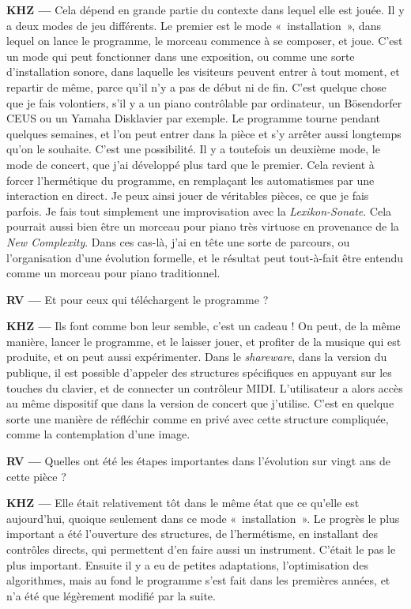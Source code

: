 \documentclass[a4paper,12pt]{article}
\newcommand{\guill}[1]{«~#1~»}
\begin{document}
\textbf{KHZ ---} Cela dépend en grande partie du contexte dans lequel elle est jouée. Il y a deux modes de jeu différents. Le premier est le mode \guill{installation}, dans lequel on lance le programme, le morceau commence à se composer, et joue. C'est un mode qui peut fonctionner dans une exposition, ou comme une sorte d'installation sonore, dans laquelle les visiteurs peuvent entrer à tout moment, et repartir de même, parce qu'il n'y a pas de début ni de fin. C'est quelque chose que je fais volontiers, s'il y a un piano contrôlable par ordinateur, un Bösendorfer CEUS ou un Yamaha Disklavier par exemple. Le programme tourne pendant quelques semaines, et l'on peut entrer dans la pièce et s'y arrêter aussi longtemps qu'on le souhaite. C'est une possibilité. Il y a toutefois un deuxième mode, le mode de concert, que j'ai développé plus tard que le premier. Cela revient à forcer l'hermétique du programme, en remplaçant les automatismes par une interaction en direct. Je peux ainsi jouer de véritables pièces, ce que je fais parfois. Je fais tout simplement une improvisation avec la \emph{Lexikon-Sonate}. Cela pourrait aussi bien être un morceau pour piano très virtuose en provenance de la \emph{New Complexity}. Dans ces cas-là, j'ai en tête une sorte de parcours, ou l'organisation d'une évolution formelle, et le résultat peut tout-à-fait être entendu comme un morceau pour piano traditionnel.

\textbf{RV ---} Et pour ceux qui téléchargent le programme ?

\textbf{KHZ ---} Ils font comme bon leur semble, c'est un cadeau ! On peut, de la même manière, lancer le programme, et le laisser jouer, et profiter de la musique qui est produite, et on peut aussi expérimenter. Dans le \emph{shareware}, dans la version du publique, il est possible d'appeler des structures spécifiques en appuyant sur les touches du clavier, et de connecter un contrôleur MIDI. L'utilisateur a alors accès au même dispositif que dans la version de concert que j'utilise. C'est en quelque sorte une manière de réfléchir comme en privé avec cette structure compliquée, comme la contemplation d'une image.

\textbf{RV ---} Quelles ont été les étapes importantes dans l'évolution sur vingt ans de cette pièce ?

\textbf{KHZ ---} Elle était relativement tôt dans le même état que ce qu'elle est aujourd'hui, quoique seulement dans ce mode \guill{installation}. Le progrès le plus important a été l'ouverture des structures, de l'hermétisme, en installant des contrôles directs, qui permettent d'en faire aussi un instrument. C'était le pas le plus important. Ensuite il y a eu de petites adaptations, l'optimisation des algorithmes, mais au fond le programme s'est fait dans les premières années, et n'a été que légèrement modifié par la suite.
\end{document}

